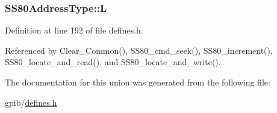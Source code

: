 \subsubsection[{\texorpdfstring{L}{L}}]{ S\+S80\+Address\+Type\+::L}\hypertarget{unionSS80AddressType_a4949ed9f8da550f9e09937db92750586}{}\label{unionSS80AddressType_a4949ed9f8da550f9e09937db92750586}


Definition at line 192 of file defines.\+h.



Referenced by Clear\+\_\+\+Common(), S\+S80\+\_\+cmd\+\_\+seek(), S\+S80\+\_\+increment(), S\+S80\+\_\+locate\+\_\+and\+\_\+read(), and S\+S80\+\_\+locate\+\_\+and\+\_\+write().



The documentation for this union was generated from the following file\+:\begin{DoxyCompactItemize}
\item 
gpib/\hyperlink{defines_8h}{defines.\+h}\end{DoxyCompactItemize}
